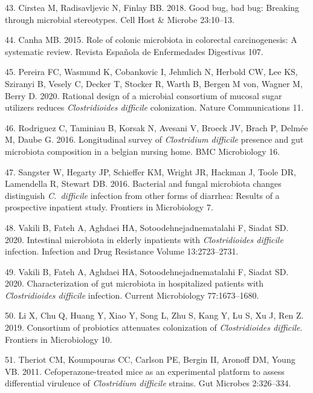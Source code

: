 \documentclass[
  11pt,
]{article}
\begin{document}
\leavevmode\hypertarget{ref-Cirstea2018}{}%
43. Cirstea M, Radisavljevic N, Finlay BB. 2018. Good bug, bad bug:
Breaking through microbial stereotypes. Cell Host \& Microbe 23:10--13.

\leavevmode\hypertarget{ref-BorgesCanha2015}{}%
44. Canha MB. 2015. Role of colonic microbiota in colorectal
carcinogenesis: A systematic review. Revista Española de Enfermedades
Digestivas 107.

\leavevmode\hypertarget{ref-Pereira2020}{}%
45. Pereira FC, Wasmund K, Cobankovic I, Jehmlich N, Herbold CW, Lee KS,
Sziranyi B, Vesely C, Decker T, Stocker R, Warth B, Bergen M von, Wagner
M, Berry D. 2020. Rational design of a microbial consortium of mucosal
sugar utilizers reduces \emph{Clostridioides difficile} colonization.
Nature Communications 11.

\leavevmode\hypertarget{ref-Rodriguez2016}{}%
46. Rodriguez C, Taminiau B, Korsak N, Avesani V, Broeck JV, Brach P,
Delmée M, Daube G. 2016. Longitudinal survey of \emph{Clostridium
difficile} presence and gut microbiota composition in a belgian nursing
home. BMC Microbiology 16.

\leavevmode\hypertarget{ref-Sangster2016}{}%
47. Sangster W, Hegarty JP, Schieffer KM, Wright JR, Hackman J, Toole
DR, Lamendella R, Stewart DB. 2016. Bacterial and fungal microbiota
changes distinguish \emph{C.~difficile} infection from other forms of
diarrhea: Results of a prospective inpatient study. Frontiers in
Microbiology 7.

\leavevmode\hypertarget{ref-Vakili2020a}{}%
48. Vakili B, Fateh A, Aghdaei HA, Sotoodehnejadnematalahi F, Siadat SD.
2020. Intestinal microbiota in elderly inpatients with
\emph{Clostridioides difficile} infection. Infection and Drug Resistance
Volume 13:2723--2731.

\leavevmode\hypertarget{ref-Vakili2020b}{}%
49. Vakili B, Fateh A, Aghdaei HA, Sotoodehnejadnematalahi F, Siadat SD.
2020. Characterization of gut microbiota in hospitalized patients with
\emph{Clostridioides difficile} infection. Current Microbiology
77:1673--1680.

\leavevmode\hypertarget{ref-Li2019}{}%
50. Li X, Chu Q, Huang Y, Xiao Y, Song L, Zhu S, Kang Y, Lu S, Xu J, Ren
Z. 2019. Consortium of probiotics attenuates colonization of
\emph{Clostridioides difficile}. Frontiers in Microbiology 10.

\leavevmode\hypertarget{ref-Theriot2011}{}%
51. Theriot CM, Koumpouras CC, Carlson PE, Bergin II, Aronoff DM, Young
VB. 2011. Cefoperazone-treated mice as an experimental platform to
assess differential virulence of \emph{Clostridium difficile} strains.
Gut Microbes 2:326--334.
\end{document}
